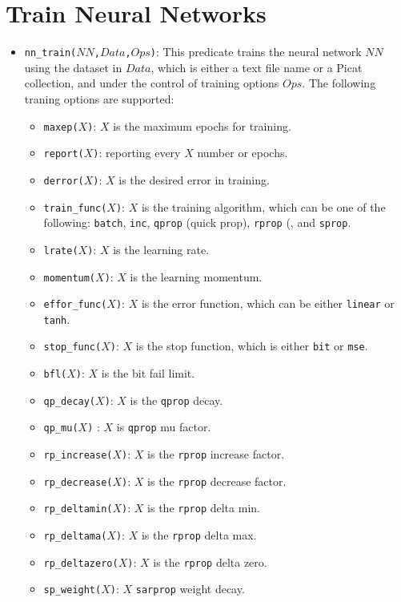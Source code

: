 \section{Train Neural Networks}
\begin{itemize}
\item \texttt{nn\_train($NN$,$Data$,$Ops$)}: This predicate trains the neural network $NN$ using the dataset in $Data$, which is either a text file name or a Picat collection, and under the control of training options $Ops$. The following traning options are supported:
\begin{itemize}
\item \texttt{maxep($X$)}: $X$ is the maximum epochs for training.
\item \texttt{report($X$)}:	reporting every $X$ number or epochs. 
\item \texttt{derror($X$)}:	$X$ is the desired error in training.
\item \texttt{train\_func($X$)}: $X$ is the training algorithm, which can be one of the following: \texttt{batch}, \texttt{inc}, \texttt{qprop} (quick prop), \texttt{rprop} (, and \texttt{sprop}.
\item \texttt{lrate($X$)}: $X$ is the learning rate.
\item \texttt{momentum($X$)}: $X$ is the learning momentum.
\item \texttt{effor\_func($X$)}: $X$ is the error function, which can be either \texttt{linear} or \texttt{tanh}.
\item \texttt{stop\_func($X$)}:	$X$ is the stop function, which is either \texttt{bit} or \texttt{mse}.
\item \texttt{bfl($X$)}:  $X$ is the bit fail limit.
\item \texttt{qp\_decay($X$)}:	 $X$ is the \texttt{qprop} decay.
\item \texttt{qp\_mu($X$)} : $X$ is \texttt{qprop}  mu factor.
\item \texttt{rp\_increase($X$)}:	$X$ is the \texttt{rprop} increase factor.
\item \texttt{rp\_decrease($X$)}: $X$ is the \texttt{rprop} decrease factor.
\item \texttt{rp\_deltamin($X$)}: $X$ is the \texttt{rprop} delta min.
\item \texttt{rp\_deltama($X$)}: $X$ is the \texttt{rprop} delta max.
\item \texttt{rp\_deltazero($X$)}: $X$ is the  \texttt{rprop} delta zero.
\item \texttt{sp\_weight($X$)}:	$X$	 \texttt{sarprop} weight decay.

\end{itemize}
\end{itemize}
